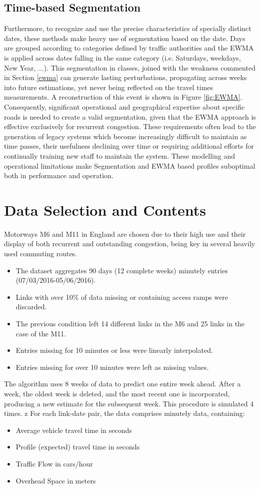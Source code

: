 \documentclass[a4paper, 10pt, conference]{ieeeconf}      %
\begin{document}
\subsection{Time-based Segmentation}\label{segmentation}
Furthermore, to recognize and use the precise characteristics of specially distinct dates, these methods make heavy use of segmentation based on the date. 
Days are grouped according to categories defined by traffic authorities and the EWMA is applied across dates falling in the same category (i.e. Saturdays, weekdays, New Year, ...).
This segmentation in classes, joined with the weakness commented in Section \ref{ewma} can generate lasting perturbations, propagating across weeks into future estimations, yet never being reflected on the travel times measurements. A reconstruction of this event is shown in Figure \ref{fig:EWMA}.
Consequently, significant operational and geographical expertise about specific roads is needed to create a valid segmentation, given that the EWMA approach is effective exclusively for recurrent congestion. 
These requirements often lead to the generation of legacy systems which become increasingly difficult to maintain as time passes, their usefulness declining over time or requiring additional efforts for continually training new staff to maintain the system.
These modelling and operational limitations make Segmentation and EWMA based profiles suboptimal both in performance and operation.
\section{Data Selection and Contents}
Motorways M6 and M11 in England are chosen due to their high use and their display of both recurrent and outstanding congestion, being key in several heavily used commuting routes. 
\begin{itemize}
	\item The dataset aggregates 90 days (12 complete weeks) minutely entries (07/03/2016-05/06/2016).
	\item Links with over 10\% of data missing or containing access ramps were discarded.
	\item The previous condition left 14 different links in the M6 and 25 links in the case of the M11.
	\item Entries missing for 10 minutes or less were linearly interpolated.
	\item Entries missing for over 10 minutes were left as missing values.
\end{itemize}
The algorithm uses 8 weeks of data to predict one entire week ahead.
After a week, the oldest week is deleted, and the most recent one is incorporated, producing a new estimate for the subsequent week.
This procedure is simulated 4 times.
z
For each link-date pair, the data comprises minutely data, containing:
\begin{itemize}
	\item Average vehicle travel time in seconds
	\item Profile (expected) travel time in seconds
	\item Traffic Flow in cars/hour
	\item Overhead Space in meters
\end{itemize}
\end{document}
